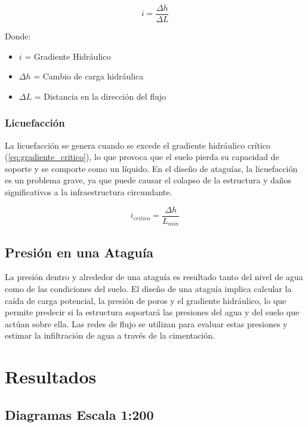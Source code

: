 \begin{equation}
    i = \frac{\Delta h}{\Delta L}
    \label{eq:gradiente_hidraulico}
\end{equation}

Donde:
\begin{itemize}
    \item $i$ = Gradiente Hidráulico
    \item $\Delta h$ = Cambio de carga hidráulica
    \item $\Delta L$ = Distancia en la dirección del flujo
\end{itemize}

\subsubsection{Licuefacción}
La licuefacción se genera cuando se excede el gradiente hidráulico crítico (\ref{eq:gradiente_critico}), lo que provoca que el suelo pierda su capacidad de soporte y se comporte como un líquido. En el diseño de ataguías, la licuefacción es un problema grave, ya que puede causar el colapso de la estructura y daños significativos a la infraestructura circundante. \textbf{\cite{budhu_soil_2010}}

\begin{equation}
    i_{critico} = \frac{\Delta h}{L_{min}}
    \label{eq:gradiente_critico}
\end{equation}

\subsection{Presión en una Ataguía}
La presión dentro y alrededor de una ataguía es resultado tanto del nivel de agua como de las condiciones del suelo. El diseño de una ataguía implica calcular la caída de carga potencial, la presión de poros y el gradiente hidráulico, lo que permite predecir si la estructura soportará las presiones del agua y del suelo que actúan sobre ella. Las redes de flujo se utilizan para evaluar estas presiones y estimar la infiltración de agua a través de la cimentación. \cite{sivakugan2005}

\section{Resultados}

\subsection{Diagramas Escala 1:200}

